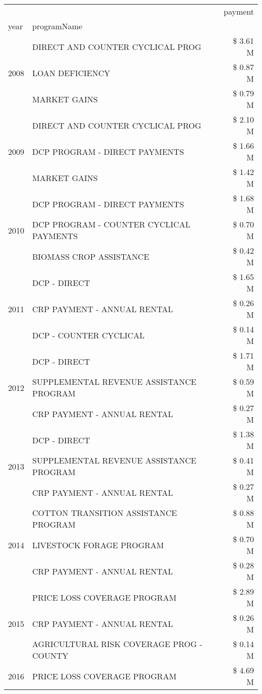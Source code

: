 \begin{tabular}{llr}
\toprule
 &  & payment \\
year & programName &  \\
\midrule
\multirow[t]{3}{*}{2008} & DIRECT AND COUNTER CYCLICAL PROG & \$ 3.61 M \\
 & LOAN DEFICIENCY & \$ 0.87 M \\
 & MARKET GAINS & \$ 0.79 M \\
\cline{1-3}
\multirow[t]{3}{*}{2009} & DIRECT AND COUNTER CYCLICAL PROG & \$ 2.10 M \\
 & DCP PROGRAM - DIRECT PAYMENTS & \$ 1.66 M \\
 & MARKET GAINS & \$ 1.42 M \\
\cline{1-3}
\multirow[t]{3}{*}{2010} & DCP PROGRAM - DIRECT PAYMENTS & \$ 1.68 M \\
 & DCP PROGRAM - COUNTER CYCLICAL PAYMENTS & \$ 0.70 M \\
 & BIOMASS CROP ASSISTANCE & \$ 0.42 M \\
\cline{1-3}
\multirow[t]{3}{*}{2011} & DCP - DIRECT & \$ 1.65 M \\
 & CRP PAYMENT - ANNUAL RENTAL & \$ 0.26 M \\
 & DCP - COUNTER CYCLICAL & \$ 0.14 M \\
\cline{1-3}
\multirow[t]{3}{*}{2012} & DCP - DIRECT & \$ 1.71 M \\
 & SUPPLEMENTAL REVENUE ASSISTANCE PROGRAM & \$ 0.59 M \\
 & CRP PAYMENT - ANNUAL RENTAL & \$ 0.27 M \\
\cline{1-3}
\multirow[t]{3}{*}{2013} & DCP - DIRECT & \$ 1.38 M \\
 & SUPPLEMENTAL REVENUE ASSISTANCE PROGRAM & \$ 0.41 M \\
 & CRP PAYMENT - ANNUAL RENTAL & \$ 0.27 M \\
\cline{1-3}
\multirow[t]{3}{*}{2014} & COTTON TRANSITION ASSISTANCE PROGRAM & \$ 0.88 M \\
 & LIVESTOCK FORAGE PROGRAM & \$ 0.70 M \\
 & CRP PAYMENT - ANNUAL RENTAL & \$ 0.28 M \\
\cline{1-3}
\multirow[t]{3}{*}{2015} & PRICE LOSS COVERAGE PROGRAM & \$ 2.89 M \\
 & CRP PAYMENT - ANNUAL RENTAL & \$ 0.26 M \\
 & AGRICULTURAL RISK COVERAGE PROG - COUNTY & \$ 0.14 M \\
\cline{1-3}
\multirow[t]{3}{*}{2016} & PRICE LOSS COVERAGE PROGRAM                   & \$ 4.69 M \\

\end{tabular}
